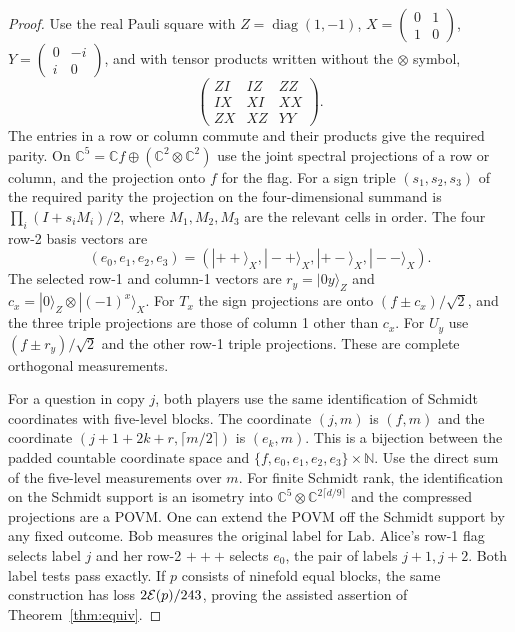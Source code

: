 \begin{proof}
Use the real Pauli square with $Z=\operatorname{diag}(1,-1)$, $X=\left(\begin{smallmatrix}0&1\\1&0\end{smallmatrix}\right)$, $Y=\left(\begin{smallmatrix}0&-i\\i&0\end{smallmatrix}\right)$, and with tensor products written without the $\otimes$ symbol,
\[
 \begin{pmatrix}
 ZI & IZ & ZZ\\
 IX & XI & XX\\
 ZX & XZ & YY
 \end{pmatrix}.
\]
The entries in a row or column commute and their products give the required parity. On $\mathbb C^5=\mathbb C f\oplus (\mathbb C^2\otimes\mathbb C^2)$ use the joint spectral projections of a row or column, and the projection onto $f$ for the flag. For a sign triple $(s_1,s_2,s_3)$ of the required parity the projection on the four-dimensional summand is $\prod_i (I+s_i M_i)/2$, where $M_1,M_2,M_3$ are the relevant cells in order. The four row-2 basis vectors are
\[
 (e_0,e_1,e_2,e_3)=(|++\rangle_X,|-+\rangle_X,|+-\rangle_X,|--\rangle_X).
\]
The selected row-1 and column-1 vectors are $r_y=|0y\rangle_Z$ and $c_x=|0\rangle_Z\otimes|(-1)^x\rangle_X$. For $T_x$ the sign projections are onto $(f\pm c_x)/\sqrt2$, and the three triple projections are those of column 1 other than $c_x$. For $U_y$ use $(f\pm r_y)/\sqrt2$ and the other row-1 triple projections. These are complete orthogonal measurements.

For a question in copy $j$, both players use the same identification of Schmidt coordinates with five-level blocks. The coordinate $(j,m)$ is $(f,m)$ and the coordinate $(j+1+2k+r,\lceil m/2\rceil)$ is $(e_k,m)$. This is a bijection between the padded countable coordinate space and $\{f,e_0,e_1,e_2,e_3\}\times\mathbb N$. Use the direct sum of the five-level measurements over $m$. For finite Schmidt rank, the identification on the Schmidt support is an isometry into $\mathbb C^5\otimes\mathbb C^{2\lceil d/9\rceil}$ and the compressed projections are a POVM. One can extend the POVM off the Schmidt support by any fixed outcome. Bob measures the original label for $\mathrm{Lab}$. Alice's row-1 flag selects label $j$ and her row-2 $+++ $ selects $e_0$, the pair of labels $j+1,j+2$. Both label tests pass exactly. If $p$ consists of ninefold equal blocks, the same construction has loss $2\mathcal{E}(p)/243$, proving the assisted assertion of Theorem~\ref{thm:equiv}.


\end{proof}
